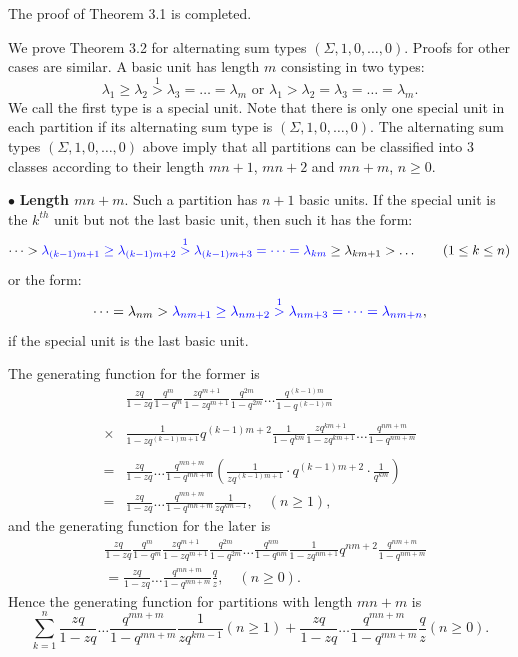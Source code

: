\documentclass[draft]{amsart}
\numberwithin{equation}{section}
\theoremstyle{plain}
\theoremstyle{remark}
\begin{document}
The proof of Theorem 3.1 is completed.


We prove Theorem 3.2 for alternating sum types $(\Sigma, 1,0, \dots, 0)$. Proofs for other cases are similar.
A basic unit has length $m$ consisting in two types:
$$
\lambda_{1} \geq \lambda_{2}\overset{1}{>}\lambda_{3}=\dots=\lambda_{m} \mbox{  or } \lambda_{1}>\lambda_{2}=\lambda_{3}=\dots=\lambda_{m}.
$$
We call the first type is a special unit. Note that there is only one special unit in each partition if its  alternating sum type is $(\Sigma, 1,0, \dots, 0)$. The alternating sum types  $(\Sigma, 1,0, \dots, 0)$ above imply that all partitions can be classified into $3$ classes according to their length $mn+1$,  $mn+2$ and $mn+m$, $n\geq 0$.

$\bullet$ {\bf Length $mn+m.$} Such a partition has $n+1$ basic units.
If the special unit is the $k^{th}$ unit but not the last basic unit, then such it has the form:
$$
\dots>
{\color{blue}\lambda_{(k-1)m+1}\geq \lambda_{(k-1)m+2}\overset{1}{>}\lambda_{(k-1)m+3}=\dots=\lambda_{km}}\geq \lambda_{km+1}>\dots \quad    \quad(1\leq k\leq n)
$$
or the form:
$$
\dots=\lambda_{nm}>
{\color{blue}\lambda_{nm+1}\geq \lambda_{nm+2}\overset{1}{>}\lambda_{nm+3}=\dots=\lambda_{nm+n}},
$$
if the special unit is the last basic unit.

The generating function for the former is
\begin{align*}
&\frac{zq}{1-zq}\frac{q^{m}}{1-q^{m}}\frac{zq^{m+1}}{1-zq^{m+1}}\frac{q^{2m}}{1-q^{2m}}\dots\frac{q^{(k-1)m}}{1-q^{(k-1)m}}\\\nonumber\\
\times&\frac{1}{1-zq^{(k-1)m+1}}q^{(k-1)m+2}\frac{1}{1-q^{km}}\frac{zq^{km+1}}{1-zq^{km+1}}\dots \frac{q^{nm+m}}{1-q^{nm+m}}\\ \nonumber\\
=&\frac{zq}{1-zq}\dots\frac{q^{mn+m}}{1-q^{mn+m}}\left(  \frac{1}{zq^{(k-1)m+1}} \cdot q^{(k-1)m+2} \cdot \frac{1}{q^{km}}  \right)\nonumber\\
=&\frac{zq}{1-zq}\dots\frac{q^{mn+m}}{1-q^{mn+m}}\frac{1}{zq^{km-1}},\label{3.26} \quad(n\geq1),
\end{align*}
and the generating function for the later is
\begin{align*}
&\frac{zq}{1-zq}\frac{q^{m}}{1-q^{m}}\frac{zq^{m+1}}{1-zq^{m+1}}\frac{q^{2m}}{1-q^{2m}}\dots\frac{q^{nm}}{1-q^{nm}}\frac{1}{1-zq^{nm+1}}q^{nm+2}\frac{q^{nm+m}}{1-q^{nm+m}}\nonumber\\
&=\frac{zq}{1-zq}\dots\frac{q^{mn+m}}{1-q^{mn+m}}\frac{q}{z},  \quad (n\geq 0).
\end{align*}
Hence the generating function for partitions with length $mn+m$ is
\begin{equation}
\sum_{k=1}^{n}\frac{zq}{1-zq}\dots\frac{q^{mn+m}}{1-q^{mn+m}}\frac{1}{zq^{km-1}}(n\geq 1)+\frac{zq}{1-zq}\dots\frac{q^{mn+m}}{1-q^{mn+m}}\frac{q}{z}(n\geq0).\label{3.26}
\end{equation}
\end{document}
